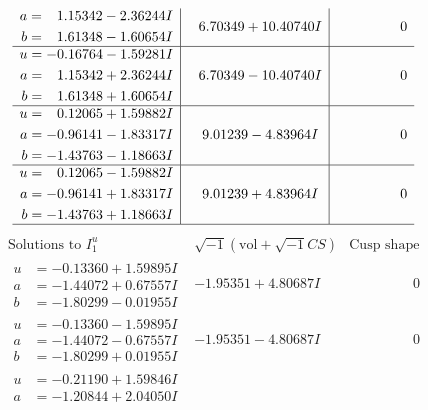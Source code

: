 \documentclass[1p]{elsarticle_modified}
\theoremstyle{definition}
\newcommand{\I}{\sqrt{-1}}
\begin{document}
$$\begin{array}{c|c|c}
\begin{aligned}
a &= \phantom{-}1.15342 - 2.36244 I \\
b &= \phantom{-}1.61348 - 1.60654 I\end{aligned}
 & \phantom{-}6.70349 + 10.40740 I & \phantom{-0.000000 } 0 \\ \hline\begin{aligned}
u &= -0.16764 - 1.59281 I \\
a &= \phantom{-}1.15342 + 2.36244 I \\
b &= \phantom{-}1.61348 + 1.60654 I\end{aligned}
 & \phantom{-}6.70349 - 10.40740 I & \phantom{-0.000000 } 0 \\ \hline\begin{aligned}
u &= \phantom{-}0.12065 + 1.59882 I \\
a &= -0.96141 - 1.83317 I \\
b &= -1.43763 - 1.18663 I\end{aligned}
 & \phantom{-}9.01239 - 4.83964 I & \phantom{-0.000000 } 0 \\ \hline\begin{aligned}
u &= \phantom{-}0.12065 - 1.59882 I \\
a &= -0.96141 + 1.83317 I \\
b &= -1.43763 + 1.18663 I\end{aligned}
 & \phantom{-}9.01239 + 4.83964 I & \phantom{-0.000000 } 0\\
 \hline 
 \end{array}$$\newpage$$\begin{array}{c|c|c}  
\text{Solutions to }I^u_{1}& \I (\text{vol} + \sqrt{-1}CS) & \text{Cusp shape}\\
 \hline 
\begin{aligned}
u &= -0.13360 + 1.59895 I \\
a &= -1.44072 + 0.67557 I \\
b &= -1.80299 - 0.01955 I\end{aligned}
 & -1.95351 + 4.80687 I & \phantom{-0.000000 } 0 \\ \hline\begin{aligned}
u &= -0.13360 - 1.59895 I \\
a &= -1.44072 - 0.67557 I \\
b &= -1.80299 + 0.01955 I\end{aligned}
 & -1.95351 - 4.80687 I & \phantom{-0.000000 } 0 \\ \hline\begin{aligned}
u &= -0.21190 + 1.59846 I \\
a &= -1.20844 + 2.04050 I \\

\end{aligned}
\end{array}$$
\end{document}
